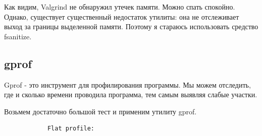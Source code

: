 \documentclass[12pt]{article}
\begin{document}
	Как видим, Valgrind не обнаружил утечек памяти. Можно спать спокойно. Однако, существует существенный недостаток утилиты: она не отслеживает выход за границы выделенной памяти. Поэтому я стараюсь использовать средство fsanitize.
	
	\subsection*{gprof}
	
	Gprof - это инструмент для профилирования программы. Мы можем отследить, где и сколько времени проводила программа, тем самым выявляя слабые участки.
	
	Возьмем достаточно большой тест и применим утилиту gprof.
	
	\begin{small}
		\begin{verbatim}
			Flat profile:
			

\end{verbatim}
\end{small}
\end{document}
